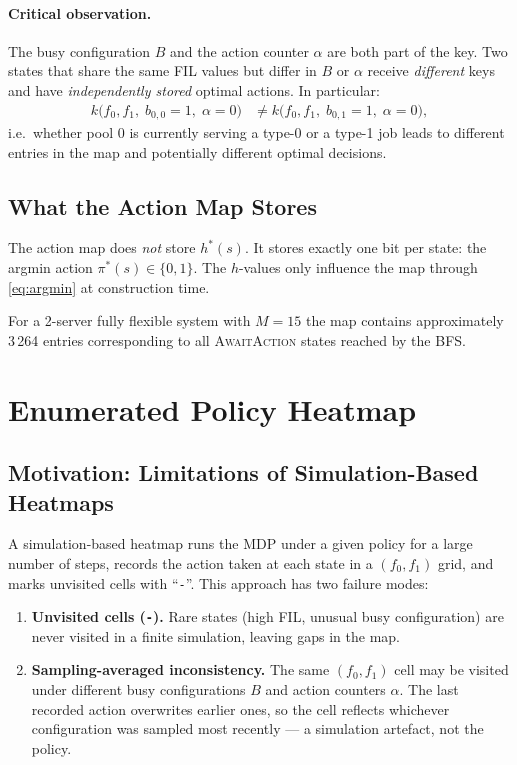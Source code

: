 \documentclass[11pt,a4paper]{article}
\begin{document}
\paragraph{Critical observation.}
The busy configuration $B$ and the action counter $\alpha$ are both part of
the key.  Two states that share the same FIL values but differ in $B$ or
$\alpha$ receive \emph{different} keys and have \emph{independently stored}
optimal actions.  In particular:
\begin{align*}
  k\!\bigl(f_0, f_1,\; b_{0,0}{=}1,\; \alpha{=}0\bigr)
  &\neq
  k\!\bigl(f_0, f_1,\; b_{0,1}{=}1,\; \alpha{=}0\bigr),
\end{align*}
i.e.\ whether pool 0 is currently serving a type-0 or a type-1 job
leads to different entries in the map and potentially different optimal
decisions.

\subsection{What the Action Map Stores}

The action map does \emph{not} store $h^*(s)$.  It stores exactly one bit
per state: the argmin action $\pi^*(s) \in \{0, 1\}$.  The $h$-values
only influence the map through \eqref{eq:argmin} at construction time.

For a 2-server fully flexible system with $M = 15$ the map contains
approximately 3\,264 entries corresponding to all \textsc{AwaitAction} states
reached by the BFS.


\section{Enumerated Policy Heatmap}
\label{sec:heatmap}

\subsection{Motivation: Limitations of Simulation-Based Heatmaps}

A simulation-based heatmap runs the MDP under a given policy for a large number
of steps, records the action taken at each state in a $(f_0, f_1)$ grid, and
marks unvisited cells with ``\texttt{-}''.  This approach has two failure modes:

\begin{enumerate}
  \item \textbf{Unvisited cells (\texttt{-}).}
    Rare states (high FIL, unusual busy configuration) are never visited in a
    finite simulation, leaving gaps in the map.

  \item \textbf{Sampling-averaged inconsistency.}
    The same $(f_0, f_1)$ cell may be visited under different busy
    configurations $B$ and action counters $\alpha$.  The last recorded action
    overwrites earlier ones, so the cell reflects whichever configuration was
    sampled most recently --- a simulation artefact, not the policy.
\end{enumerate}
\end{document}

